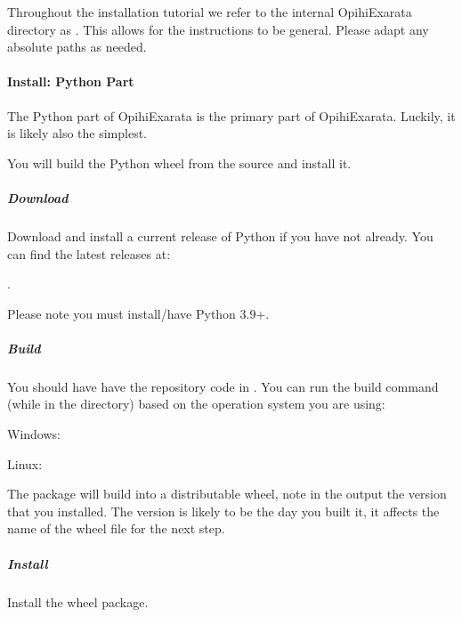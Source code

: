 \documentclass[letterpaper,11pt,english]{sphinxmanual}
\begin{document}
\sphinxAtStartPar
Throughout the installation tutorial we refer to the internal OpihiExarata
directory as . This allows for the instructions to be general.
Please adapt any absolute paths as needed.

\sphinxstepscope


\paragraph{Install: Python Part}
\label{\detokenize{technical/installation/python:install-python-part}}\label{\detokenize{technical/installation/python:technical-installation-python-part}}\label{\detokenize{technical/installation/python::doc}}
\sphinxAtStartPar
The Python part of OpihiExarata is the primary part of OpihiExarata. Luckily,
it is likely also the simplest.

\sphinxAtStartPar
You will build the Python wheel from the source and install it.


\subparagraph{Download}
\label{\detokenize{technical/installation/python:download}}
\sphinxAtStartPar
Download and install a current release of Python if you have not already. You
can find the latest releases at: %
\begin{footnote}[27]\sphinxAtStartFootnote
{}
%
\end{footnote}.

\sphinxAtStartPar
Please note you must install/have Python 3.9+.


\subparagraph{Build}
\label{\detokenize{technical/installation/python:build}}
\sphinxAtStartPar
You should have have the repository code in . You can
run the build command (while in the directory) based on the operation system
you are using:

\sphinxAtStartPar
Windows: 

\sphinxAtStartPar
Linux: 

\sphinxAtStartPar
The package will build into a distributable wheel, note in the output the
version that you installed. The version is likely to be the day you built it,
it affects the name of the wheel file for the next step.


\subparagraph{Install}
\label{\detokenize{technical/installation/python:install}}
\sphinxAtStartPar
Install the wheel package.
\end{document}
